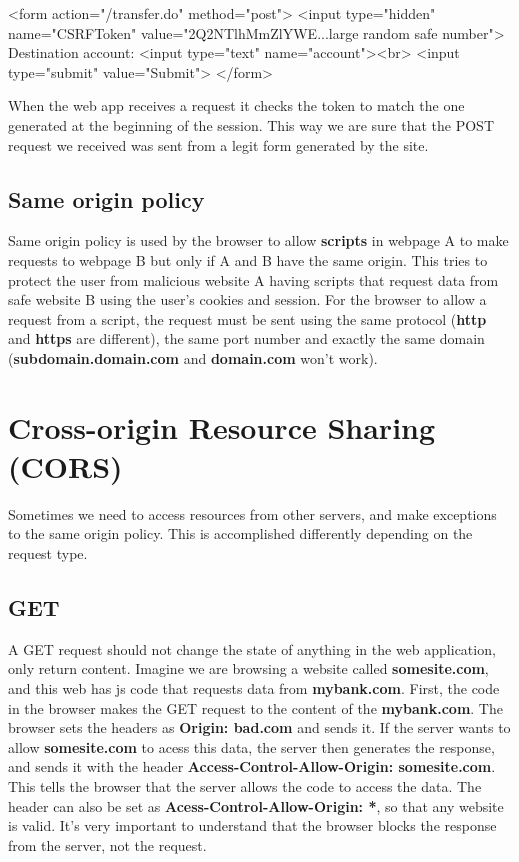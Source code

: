\begin{html}
<form action="/transfer.do" method="post">
<input type="hidden" name="CSRFToken"  value="2Q2NTlhMmZlYWE...large random safe number">
Destination account: <input type="text" name="account"><br>
<input type="submit" value="Submit">
</form>
\end{html}
 
When the web app receives a request it checks the token to match the one generated at the beginning of the session. This way we are sure that the POST request we received was sent from a legit form generated by the site.

\subsection{Same origin policy}
Same origin policy is used by the browser to allow \textbf{scripts} in webpage A to make requests to webpage B but only if A and B have the same origin.
This tries to protect the user from malicious website A having scripts that request data from safe website B using the user's cookies and session. For the browser to allow a request from a script, the request must be sent using the same protocol (\textbf{http} and \textbf{https} are different), the same port number and exactly the same domain (\textbf{subdomain.domain.com }and \textbf{domain.com} won't work).

\section{Cross-origin Resource Sharing (CORS)}
Sometimes we need to access resources from other servers, and make exceptions to the same origin policy. This is accomplished differently depending on the request type.

\subsection{GET}
A GET request should not change the state of anything in the web application, only return content. 
Imagine we are browsing a website called \textbf{somesite.com}, and this web has js code that requests data from \textbf{mybank.com}. First, the code in the browser makes the GET request to the content of the \textbf{mybank.com}. The browser sets the headers as \textbf{Origin: bad.com} and sends it. If the server wants to allow \textbf{somesite.com} to acess this data, the server then generates the response, and sends it with the header \textbf{Access-Control-Allow-Origin: somesite.com}. This tells the browser that the server allows the code to access the data. The header can also be set as \textbf{Acess-Control-Allow-Origin: *}, so that any website is valid. It's very important to understand that the browser blocks the response from the server, not the request.

